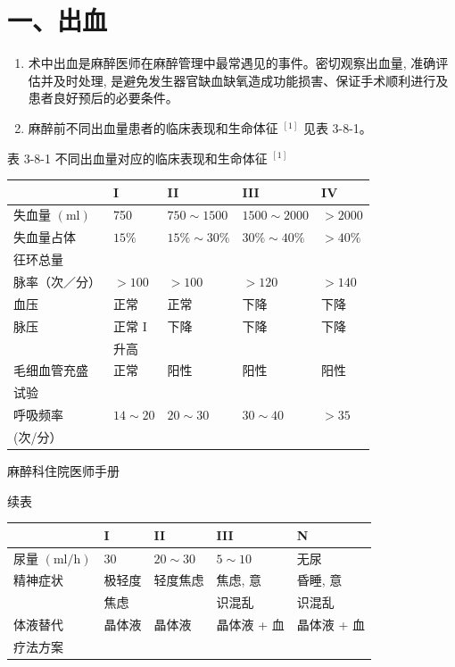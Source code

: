 \documentclass[10pt]{article}
\begin{document}
\section*{一、出血}
\begin{enumerate}
  \item 术中出血是麻醉医师在麻醉管理中最常遇见的事件。密切观察出血量, 准确评估并及时处理, 是避免发生器官缺血缺氧造成功能损害、保证手术顺利进行及患者良好预后的必要条件。

  \item 麻醉前不同出血量患者的临床表现和生命体征 ${ }^{[1]}$ 见表 3-8-1。

\end{enumerate}

表 3-8-1 不同出血量对应的临床表现和生命体征 ${ }^{[1]}$

\begin{center}
\begin{tabular}{lllll}
\hline
 & I & II & III & IV \\
\hline
失血量 $(\mathrm{ml})$ & 750 & $750 \sim 1500$ & $1500 \sim 2000$ & $>2000$ \\
失血量占体 & $15 \%$ & $15 \% \sim 30 \%$ & $30 \% \sim 40 \%$ & $>40 \%$ \\
彺环总量 &  &  &  &  \\
脉率（次／分） & $>100$ & $>100$ & $>120$ & $>140$ \\
血压 & 正常 & 正常 & 下降 & 下降 \\
脉压 & 正常 I & 下降 & 下降 & 下降 \\
 & 升高 &  &  &  \\
毛细血管充盛 & 正常 & 阳性 & 阳性 & 阳性 \\
试验 &  &  &  &  \\
呼吸频率 & $14 \sim 20$ & $20 \sim 30$ & $30 \sim 40$ & $>35$ \\
(次/分） &  &  &  &  \\
\hline
\end{tabular}
\end{center}

麻醉科住院医师手册

续表

\begin{center}
\begin{tabular}{lllll}
\hline
 & I & II & III & N \\
\hline
尿量 $(\mathrm{ml} / \mathrm{h})$ & 30 & $20 \sim 30$ & $5 \sim 10$ & 无尿 \\
精神症状 & 极轻度 & 轻度焦虑 & 焦虑, 意 & 昏睡, 意 \\
 & 焦虑 &  & 识混乱 & 识混乱 \\
体液替代 & 晶体液 & 晶体液 & 晶体液 + 血 & 晶体液 + 血 \\
疗法方案 &  &  &  &  \\
\hline
\end{tabular}
\end{center}
\end{document}
